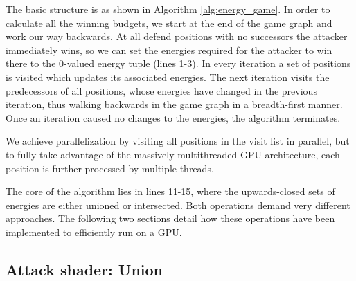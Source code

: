 The basic structure is as shown in Algorithm \ref{alg:energy_game}.
In order to calculate all the winning budgets,
we start at the end of the game graph and work our way backwards.
At all defend positions with no successors the attacker immediately wins,
so we can set the energies required for the attacker to win there to the
0-valued energy tuple (lines 1-3).
In every iteration a set of positions is visited which updates its associated
energies.
The next iteration visits the predecessors of all positions, whose energies
have changed in the previous iteration, thus walking backwards in the game
graph in a breadth-first manner. Once an iteration caused no changes to the
energies, the algorithm terminates.

We achieve parallelization by visiting all positions in the visit list in
parallel, but to fully take advantage of the massively multithreaded
GPU-architecture, each position is further processed by multiple threads.

The core of the algorithm lies in lines 11-15, where the upwards-closed sets of
energies are either unioned or intersected.
Both operations demand very different approaches.
The following two sections detail how these operations have been implemented to
efficiently run on a GPU.


\subsection{Attack shader: Union}

